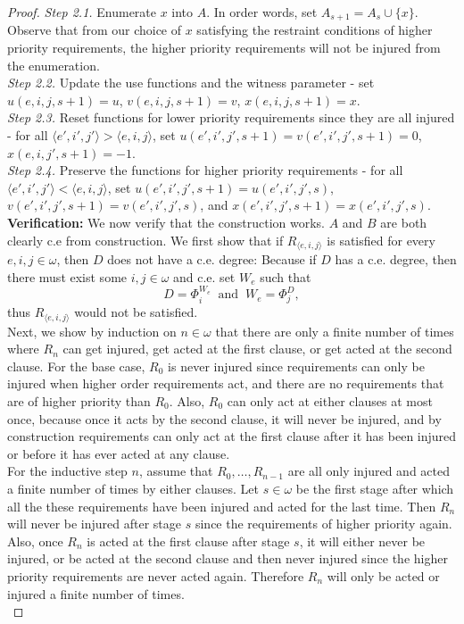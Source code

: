 \documentclass{article}
\begin{document}
\begin{proof}
    \textit{Step 2.1.} Enumerate $x$ into $A$. In order words, set
    $A_{s+1}=A_s\cup\{x\}$. Observe that from our choice of $x$
    satisfying the restraint conditions of higher priority
    requirements, the higher priority requirements will not be injured
    from the enumeration. \\

    \textit{Step 2.2.} Update the use functions and the witness parameter -
    set $u(e,i,j,s+1)=u$, $v(e,i,j,s+1)=v$, $x(e,i,j,s+1)=x$. \\

    \textit{Step 2.3.} Reset functions for lower priority requirements
    since they are all injured - for all $\langle e',i',j'\rangle >\langle
    e,i,j\rangle$, set $u(e',i',j',s+1)=v(e',i',j',s+1)=0$,
    $x(e,i,j',s+1)=-1$. \\

    \textit{Step 2.4.} Preserve the functions for higher
    priority requirements - for all $\langle e',i',j'\rangle <\langle
    e,i,j\rangle$, set $u(e',i',j',s+1)=u(e',i',j',s)$,
    $v(e',i',j',s+1)=v(e',i',j',s)$, and $x(e',i',j',s+1)=x(e',i',j',s)$.
    \\

    \textbf{Verification:} We now verify that the construction works.
    $A$ and $B$ are both clearly c.e from construction. We first show that
    if $R_{\langle e,i,j\rangle}$ is satisfied for every $e,i,j\in\omega$,
    then $D$ does not have a c.e. degree: Because if $D$ has a c.e. degree,
    then there must exist some $i,j\in\omega$ and c.e. set $W_e$ such that
    \[D=\Phi_i^{W_e}\;\; \text{and}\;\; W_e=\Phi_j^D,\]
    thus $R_{\langle e,i,j\rangle}$ would not be satisfied. \\

    Next, we show by induction on $n\in\omega$ that there are only a finite
    number of times where $R_n$ can get injured, get acted at the first
    clause, or get acted at the second clause. For the base case, $R_0$ is
    never injured since requirements can only be injured when higher order
    requirements act, and there are no requirements that are of
    higher priority than $R_0$. Also, $R_0$ can only act at either
    clauses at most once, because once it acts by the second clause, it
    will never be injured, and by construction requirements can only
    act at the first clause after it has been injured or before it has
    ever acted at any clause. \\

    For the inductive step $n$, assume that $R_0,\ldots,R_{n-1}$ are all
    only injured and acted a finite number of times by either clauses.
    Let $s\in\omega$ be the first stage after which all the these
    requirements have been injured and acted for the last time. Then
    $R_n$ will never be injured after stage $s$ since the requirements of
    higher priority again. Also, once $R_n$ is acted at the first
    clause after stage $s$, it will either never be injured, or be
    acted at the second clause and then never injured since the higher
    priority requirements are never acted again. Therefore $R_n$ will
    only be acted or injured a finite number of times. \\


\end{proof}
\end{document}
